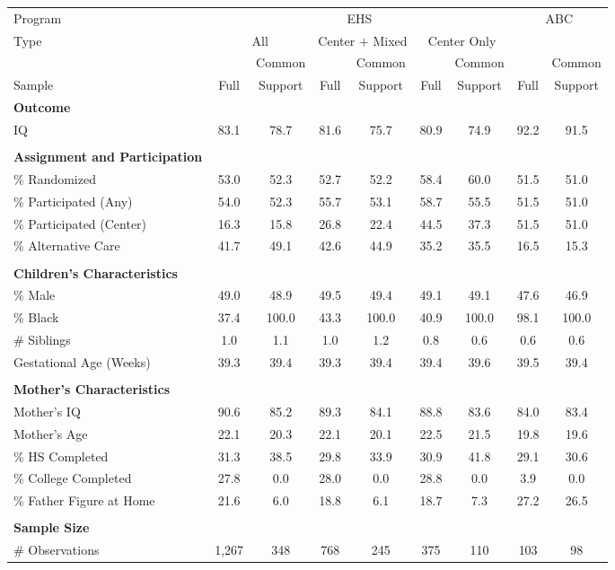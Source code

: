 \begin{tabular}{lcccccccc}
\toprule 
\midrule 
Program & \multicolumn{6}{c}{EHS} & \multicolumn{2}{c}{ABC} \\
 \cmidrule(lr){1-1} \cmidrule(lr){2-7} \cmidrule(lr){8-9} 
Type & \multicolumn{2}{c}{All} & \multicolumn{2}{c}{Center $+$ Mixed} & \multicolumn{2}{c}{Center Only} & \multicolumn{2}{c}{} \\
 \cmidrule(lr){1-1} \cmidrule(lr){2-3} \cmidrule(lr){4-5} \cmidrule(lr){6-7} \cmidrule(lr){8-9} 
 &  & Common &  & Common &  & Common &  & Common \\
Sample & Full & Support & Full & Support & Full & Support & Full & Support \\
\midrule 
\textbf{Outcome} \\
\quad IQ & 83.1 & 78.7 & 81.6 & 75.7 & 80.9 & 74.9 & 92.2 & 91.5 \\
 \\
\textbf{Assignment and Participation} \\
\quad \% Randomized & 53.0 & 52.3 & 52.7 & 52.2 & 58.4 & 60.0 & 51.5 & 51.0 \\
\quad \% Participated (Any) & 54.0 & 52.3 & 55.7 & 53.1 & 58.7 & 55.5 & 51.5 & 51.0 \\
\quad \% Participated (Center) & 16.3 & 15.8 & 26.8 & 22.4 & 44.5 & 37.3 & 51.5 & 51.0 \\
\quad \% Alternative Care & 41.7 & 49.1 & 42.6 & 44.9 & 35.2 & 35.5 & 16.5 & 15.3 \\
 \\
\textbf{Children's Characteristics} \\
\quad \% Male & 49.0 & 48.9 & 49.5 & 49.4 & 49.1 & 49.1 & 47.6 & 46.9 \\
\quad \% Black & 37.4 & 100.0 & 43.3 & 100.0 & 40.9 & 100.0 & 98.1 & 100.0 \\
\quad \# Siblings & 1.0 & 1.1 & 1.0 & 1.2 & 0.8 & 0.6 & 0.6 & 0.6 \\
\quad Gestational Age (Weeks) & 39.3 & 39.4 & 39.3 & 39.4 & 39.4 & 39.6 & 39.5 & 39.4 \\
 \\
\textbf{Mother's Characteristics} \\
\quad Mother's IQ & 90.6 & 85.2 & 89.3 & 84.1 & 88.8 & 83.6 & 84.0 & 83.4 \\
\quad Mother's Age & 22.1 & 20.3 & 22.1 & 20.1 & 22.5 & 21.5 & 19.8 & 19.6 \\
\quad \% HS Completed & 31.3 & 38.5 & 29.8 & 33.9 & 30.9 & 41.8 & 29.1 & 30.6 \\
\quad \% College Completed & 27.8 & 0.0 & 28.0 & 0.0 & 28.8 & 0.0 & 3.9 & 0.0 \\
\quad \% Father Figure at Home & 21.6 & 6.0 & 18.8 & 6.1 & 18.7 & 7.3 & 27.2 & 26.5 \\
 \\
\textbf{Sample Size} \\
\quad \# Observations & 1,267 & 348 & 768 & 245 & 375 & 110 & 103 & 98 \\
\midrule 
\bottomrule 
\end{tabular}
